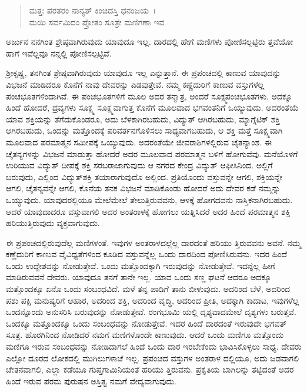 \begin{verse}
ಮತ್ತಃ ಪರತರಂ ನಾನ್ಯತ್ ಕಿಂಚಿದಸ್ತಿ ಧನಂಜಯ~।\\ಮಯಿ ಸರ್ವಮಿದಂ ಪ್ರೋತಂ ಸೂತ್ರೇ ಮಣಿಗಣಾ ಇವ 
\end{verse}

{\small ಅರ್ಜುನ ನನಗಿಂತ ಶ್ರೇಷ್ಠವಾಗಿರುವುದು ಯಾವುದೂ ಇಲ್ಲ. ದಾರದಲ್ಲಿ ಹೇಗೆ ಮಣಿಗಳು ಪೋಣಿಸಲ್ಪಟ್ಟಿರು ತ್ತವೆಯೋ ಹಾಗೆ ಇವೆಲ್ಲವೂ ನನ್ನಲ್ಲಿ ಪೋಣಿಸಲ್ಪಟ್ಟಿವೆ.}

ಶ‍್ರೀಕೃಷ್ಣ, ತನಗಿಂತ ಶ್ರೇಷ್ಠವಾಗಿರುವುದು ಯಾವುದೂ ಇಲ್ಲ ಎನ್ನುತ್ತಾನೆ. ಈ ಪ್ರಪಂಚದಲ್ಲಿ ಕಾಣುವ ಯಾವುದನ್ನು ವಿಭಜನೆ ಮಾಡಿದರೂ ಕೊನೆಗೆ ನಾವು ದೇವರನ್ನು ಎಡವುತ್ತೇವೆ. ನಮ್ಮ ಕಣ್ಣೆದುರಿಗೆ ಕಾಣುವ ವಸ್ತುಗಳೆಲ್ಲ ಪಂಚಭೂತಗಳಿಂದಾಗಿವೆ. ಈ ಪಂಚಭೂತಗಳಿಗೆ ಮೂಲ ಅದರ ತನ್ಮಾತ್ರ, ಅಂದರೆ ಸೂಕ್ಷ್ಮಪಂಚಭೂತಗಳು. ಅದಕ್ಕೂ ಹಿಂದೆ ಹೋದರೆ, ದ್ರವ್ಯಗಳು ಸೂಕ್ಷ್ಮ ಸೂಕ್ಷ್ಮವಾಗುತ್ತ ಕೊನೆಗೆ ಮೂಲವಾದ ಭಗವಂತನಿಗೆ ಒಯ್ಯುವುದು. ಅದರಂತೆಯೆ ಯಾವ ಶಕ್ತಿಯನ್ನು ತೆಗೆದುಕೊಂಡರೂ, ಅದು ಬೆಳಕಾಗಿರಬಹುದು, ವಿದ್ಯುತ್ ಆಗಿರಬಹುದು, ಮ್ಯಾಗ್ನೆಟಿಕ್ ಶಕ್ತಿ ಆಗಿರಬಹುದು, ಒಂದನ್ನು ಮತ್ತೊಂದಕ್ಕೆ ಪರಿವರ್ತನಗೊಳಿಸಲು ಸಾಧ್ಯವಾಗಬಹುದು, ಆ ಶಕ್ತಿ ಮತ್ತೆ ಸೂಕ್ಷ್ಮವಾಗಿ ಮೂಲವಾದ ಪರಮಾತ್ಮನ ಸಮೀಪಕ್ಕೆ ಒಯ್ಯುವುದು. ಅದರಂತೆಯೇ ಜೀವರಾಶಿಗಳಲ್ಲಿರುವ ಚೈತನ್ಯಾಂಶ. ಈ ಚೈತನ್ಯಗಳನ್ನು ವಿಭಜನೆ ಮಾಡುತ್ತಾ ಹೋದರೆ ಅದರ ಮೂಲವಾದ ಪರಮಾತ್ಮನ ಬಳಿಗೆ ಹೋಗುವೆವು. ಮನೆಯೊಳಗೆ ಉರಿಯುವ ವಿದ್ಯುತ್ ದೀಪಕ್ಕೆ ಶಕ್ತಿ ಸರಬರಾಜಾಗುವುದು ಆ ನಗರದ ಕೇಂದ್ರ ವಿದ್ಯುತ್ ಆಫೀಸಿನಿಂದ. ಅಲ್ಲಿಗೆ ಬರುವುದು, ಎಲ್ಲಿಂದ ವಿದ್ಯುತ್​ಶಕ್ತಿ ತಯಾರಾಗುವುದೊ ಅಲ್ಲಿಂದ. ಪ್ರತಿಯೊಂದು ವಸ್ತುವನ್ನೇ ಆಗಲಿ, ಶಕ್ತಿಯನ್ನೇ ಆಗಲಿ, ಚೈತನ್ಯವನ್ನೇ ಆಗಲಿ, ಕೊನೆಯ ತನಕ ವಿಭಜನೆ ಮಾಡಿಕೊಂಡು ಹೋದರೆ ಅದು ದೇವರ ಕಡೆ ನಮ್ಮನ್ನು ಒಯ್ಯುವುದು. ಯಾವುದರಲ್ಲಿಯೂ ಮೇಲೆಮೇಲೆ ತೇಲುತ್ತಿರುವವನು, ಆಳಕ್ಕೆ ಹೋಗದವನು ನಾಸ್ತಿಕನಾಗಿರಬಹುದು. ಆದರೆ ಯಾವುದಾದರೂ ವಸ್ತುವಾಗಲಿ ಅದರ ಅಂತರಾಳಕ್ಕೆ ಹೋಗಲು ಯತ್ನಿಸಿದರೆ ಅದರ ಹಿಂದೆ ಪರಮಾತ್ಮನ ಶಕ್ತಿ ಹರಿಯುತ್ತಿರುವುದು ವ್ಯಕ್ತವಾಗುವುದು.

ಈ ಪ್ರಪಂಚದಲ್ಲಿರುವುದೆಲ್ಲ ಮಣಿಗಳಂತೆ. ಇವುಗಳ ಅಂತರಾಳದಲ್ಲೆಲ್ಲ ದಾರದಂತೆ ಹರಿಯು ತ್ತಿರುವವನು ಅವನೆ. ನಮ್ಮ ಕಣ್ಣೆದುರಿಗೆ ಕಾಣುವ ವೈವಿಧ್ಯತೆಗಳಿಂದ ಕೂಡಿದ ವಸ್ತುವನ್ನೆಲ್ಲ ಒಂದು ದಾರದಿಂದ ಪೋಣಿಸಿರುವನು. ಇದರ ಹಿಂದೆ ಒಂದು ಉದ್ದೇಶವನ್ನು ನೋಡುತ್ತೇವೆ. ಒಂದು ಮತ್ತೊಂದಕ್ಕಾಗಿ ಇರುವುದನ್ನು ನೋಡುತ್ತೇವೆ. ಇದನ್ನೆಲ್ಲ ಹೀಗೆ ಮಾಡಿರುವವನೆ ದೇವರು. ಯಾವುದೂ ತನಗೆ ತಾನೇ ಇಲ್ಲ. ಯಾವ ಒಂದು ಸಣ್ಣ ಘಟನೆ ಆದರೂ ಅದಕ್ಕೂ ಮತ್ತೊಂದಕ್ಕೂ ಏನೊ ಒಂದು ಸಂಬಂಧವಿದೆ. ಮಳೆ ತನ್ನ ಪಾಡಿಗೆ ತಾನು ಬೀಳುವುದು. ಅದರಿಂದ ಬೆಳೆ, ಅದರಿಂದ ಪಶು ಪಕ್ಷಿ ಮನುಷ್ಯರಿಗೆ ಆಹಾರ, ಅದರಿಂದ ಶಕ್ತಿ, ಅದರಿಂದ ವೃದ್ಧಿ, ಅದರಿಂದ ಪ್ರೀತಿ, ಅದಕ್ಕಾಗಿ ಕಾದಾಟ, ಇವುಗಳೆಲ್ಲ ಒಂದನ್ನೊಂದು ಅನುಸರಿಸಿ ಬರುವುದನ್ನು ನೋಡುತ್ತೇವೆ. ರಂಗಭೂಮಿ ಯಲ್ಲಿ ದೃಶ್ಯವಾದಮೇಲೆ ದೃಶ್ಯಗಳು ಬರುತ್ತವೆ. ಒಂದಕ್ಕೂ ಮತ್ತೊಂದಕ್ಕೂ ಒಂದು ಸಂಬಂಧವನ್ನು ನೋಡುತ್ತೇವೆ. ಇದರ ಹಿಂದೆ ದಾರದಂತೆ ಇರುವುದೇ ಭಗವತ್ ಸೂತ್ರ. ಹೊರಗಿನಿಂದ ನೋಡಿದರೆ ನಮಗೆ ಮಣಿಗಳೊಂದೇ ಕಾಣುವುದು. ಆದರೆ ಒಂದು ಮಣಿಗೂ ಮತ್ತೊಂದು ಮಣಿಗೂ ಇರುವ ಸಂಬಂಧವನ್ನು ನೋಡಿದಾಗಲೆ ಹಿಂದೆ ಒಂದು ದಾರ ಇರಬೇಕೆಂದು ಭಾವಿಸಿಕೊಳ್ಳಲು ಸಾಧ್ಯ. ದೇವರು ಎಲ್ಲೋ ದೂರದ ಲೋಕದಲ್ಲಿ ಮುಗಿಲುಗಳಾಚೆ ಇಲ್ಲ. ಪ್ರಪಂಚದ ವಸ್ತುಗಳ ಅಂತರಾಳ ದಲ್ಲಿಯೂ, ಅದು ಜಡವಾಗಲಿ ಚೇತನವಾಗಲಿ, ಎಲ್ಲಾ ಕಡೆಯೂ ಗುಪ್ತಗಾಮಿನಿಯಂತೆ ಹರಿಯು ತ್ತಿರುವನು. ಪ್ರಕೃತಿಯ ಬಾಗಿಲನ್ನು ತಟ್ಟಿದಂತೆ ಅದರ ಹಿಂದೆ ಇರುವ ಪರಮ ಪುರುಷನ ಅಸ್ತಿತ್ವ ನಮಗೆ ವೇದ್ಯವಾಗುವುದು.

